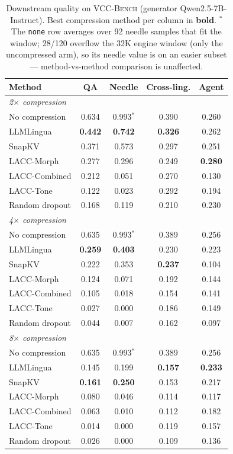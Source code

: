 \documentclass[runningheads]{llncs}
\newcommand{\method}[1]{\textsc{#1}}
\begin{document}
\begin{table}[H]
\centering
\caption{Downstream quality on \method{VCC-Bench} (generator Qwen2.5-7B-Instruct). Best compression method per column in \textbf{bold}. $^{*}$ The \texttt{none} row averages over 92 needle samples that fit the window; 28/120 overflow the 32K engine window (only the uncompressed arm), so its needle value is on an easier subset --- method-vs-method comparison is unaffected.}
\label{tab:downstream}
\begin{tabular}{lcccc}
\toprule
\textbf{Method} & \textbf{QA} & \textbf{Needle} & \textbf{Cross-ling.} & \textbf{Agent} \\
\midrule
\multicolumn{5}{l}{\emph{2$\times$ compression}} \\
No compression & 0.634 & 0.993$^{*}$ & 0.390 & 0.260 \\
LLMLingua & \textbf{0.442} & \textbf{0.742} & \textbf{0.326} & 0.262 \\
SnapKV & 0.371 & 0.573 & 0.297 & 0.251 \\
LACC-Morph & 0.277 & 0.296 & 0.249 & \textbf{0.280} \\
LACC-Combined & 0.212 & 0.051 & 0.270 & 0.130 \\
LACC-Tone & 0.122 & 0.023 & 0.292 & 0.194 \\
Random dropout & 0.168 & 0.119 & 0.210 & 0.230 \\
\midrule
\multicolumn{5}{l}{\emph{4$\times$ compression}} \\
No compression & 0.635 & 0.993$^{*}$ & 0.389 & 0.256 \\
LLMLingua & \textbf{0.259} & \textbf{0.403} & 0.230 & 0.223 \\
SnapKV & 0.222 & 0.353 & \textbf{0.237} & 0.104 \\
LACC-Morph & 0.124 & 0.071 & 0.192 & 0.144 \\
LACC-Combined & 0.105 & 0.018 & 0.154 & 0.141 \\
LACC-Tone & 0.027 & 0.000 & 0.186 & 0.149 \\
Random dropout & 0.044 & 0.007 & 0.162 & 0.097 \\
\midrule
\multicolumn{5}{l}{\emph{8$\times$ compression}} \\
No compression & 0.635 & 0.993$^{*}$ & 0.389 & 0.256 \\
LLMLingua & 0.145 & 0.199 & \textbf{0.157} & \textbf{0.233} \\
SnapKV & \textbf{0.161} & \textbf{0.250} & 0.153 & 0.217 \\
LACC-Morph & 0.080 & 0.046 & 0.114 & 0.117 \\
LACC-Combined & 0.063 & 0.010 & 0.112 & 0.182 \\
LACC-Tone & 0.014 & 0.000 & 0.119 & 0.157 \\
Random dropout & 0.026 & 0.000 & 0.109 & 0.136 \\
\bottomrule
\end{tabular}
\end{table}
\end{document}
